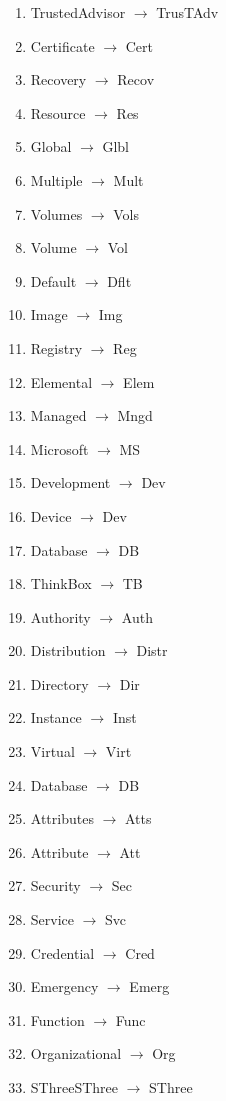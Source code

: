 \documentclass[12pt]{article}
\begin{document}
{\begin{multicols}{3}
\begin{enumerate}
  \item	TrustedAdvisor $\rightarrow$ TrusTAdv
  \item	Certificate $\rightarrow$ Cert
  \item	Recovery $\rightarrow$ Recov
  \item	Resource $\rightarrow$ Res
  \item	Global $\rightarrow$ Glbl
  \item	Multiple $\rightarrow$ Mult
  \item	Volumes $\rightarrow$ Vols
  \item	Volume $\rightarrow$ Vol
  \item	Default $\rightarrow$ Dflt
  \item	Image $\rightarrow$ Img
  \item	Registry $\rightarrow$ Reg
  \item	Elemental $\rightarrow$ Elem
  \item	Managed $\rightarrow$ Mngd
  \item	Microsoft $\rightarrow$ MS
  \item	Development $\rightarrow$ Dev
  \item	Device $\rightarrow$ Dev
  \item	Database $\rightarrow$ DB
  \item	ThinkBox $\rightarrow$ TB
  \item	Authority $\rightarrow$ Auth
  \item	Distribution $\rightarrow$ Distr
  \item	Directory $\rightarrow$ Dir
  \item	Instance $\rightarrow$ Inst
  \item	Virtual $\rightarrow$ Virt
  \item	Database $\rightarrow$ DB
  \item	Attributes $\rightarrow$ Atts
  \item	Attribute $\rightarrow$ Att
  \item	Security $\rightarrow$ Sec
  \item	Service $\rightarrow$ Svc
  \item	Credential $\rightarrow$ Cred
  \item	Emergency $\rightarrow$ Emerg
  \item	Function $\rightarrow$ Func
  \item	Organizational $\rightarrow$ Org
  \item	SThreeSThree $\rightarrow$ SThree
  \end{enumerate}
\end{multicols}
}

\printindex
\printindex[macros]
\end{document}
